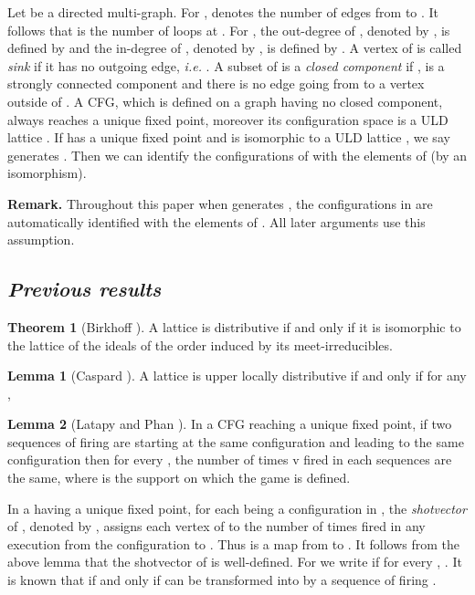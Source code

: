 \documentclass{article}
\theoremstyle{definition}
\newtheorem{lem}{Lemma}
\newtheorem{theo}{Theorem}
\begin{document}
Let  be a directed multi-graph. For ,  denotes the number of edges from  to . It follows that  is the number of loops at . For , the out-degree of , denoted by , is defined by  and the in-degree of , denoted by , is defined by . A vertex  of  is called \emph{sink} if it has no outgoing edge, \emph{i.e.} . A subset  of  is a \emph{closed component} if ,  is a strongly connected component and there is no edge going from  to a vertex outside of . A CFG, which is defined on a graph having no closed component, always reaches a unique fixed point, moreover its configuration space is a ULD lattice  \cite{BL92,LP01}. If  has a unique fixed point and  is isomorphic to a ULD lattice , we say  generates . Then we can identify the configurations of  with the elements of  (by an isomorphism).

\textbf{Remark. }Throughout this paper when  generates , the configurations in  are automatically identified with the elements of . All later arguments use this assumption.
\subsection{\small \textit{Previous results}}
\begin{theo}[Birkhoff \cite{B33}]
A lattice is distributive if and only if it is isomorphic to the lattice of the ideals of the order induced by its meet-irreducibles.
\end{theo}
\begin{lem}[Caspard \cite{C98}]
\label{condition on cover relation for ULD lattice}
A lattice  is upper locally distributive if and only if for any ,

\end{lem}
\begin{lem}[Latapy and Phan \cite{LP01}]
In a CFG reaching a unique fixed point, if two sequences of firing are starting at the same configuration and leading to the same configuration then for every , the number of times v fired in each sequences are the same, where  is the support on which the game is  defined. 
\end{lem}
In a  having a unique fixed point, for each  being a configuration in , the \emph{shotvector} of , denoted by , assigns each vertex  of  to the number of times  fired in any execution from the  configuration   to . Thus  is a map from  to . It follows from the above lemma that the shotvector of  is well-defined. For  we write  if for every , . It is known that  if and only if  can be transformed into  by a sequence of firing \cite{LP01}. 
\end{document}
